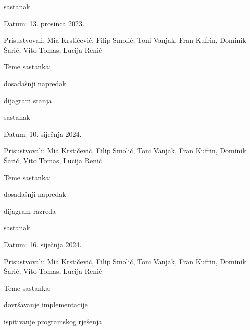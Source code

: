 \begin{packed_enum}
			\item  sastanak
			\item[] \begin{packed_item}
				\item Datum: 13. prosinca 2023.
				\item Prisustvovali: Mia Krstičević, Filip Smolić, Toni Vanjak, Fran Kufrin, Dominik Šarić, Vito Tomas, Lucija Renić
				\item Teme sastanka:
				\begin{packed_item}
					\item dosadašnji napredak
					\item dijagram stanja
				\end{packed_item}
			\end{packed_item}
			
			\item  sastanak
			\item[] \begin{packed_item}
				\item Datum: 10. siječnja 2024.
				\item Prisustvovali: Mia Krstičević, Filip Smolić, Toni Vanjak, Fran Kufrin, Dominik Šarić, Vito Tomas, Lucija Renić
				\item Teme sastanka:
				\begin{packed_item}
					\item dosadašnji napredak
					\item dijagram razreda
				\end{packed_item}
			\end{packed_item}
			
			\item  sastanak
			\item[] \begin{packed_item}
				\item Datum: 16. siječnja 2024.
				\item Prisustvovali: Mia Krstičević, Filip Smolić, Toni Vanjak, Fran Kufrin, Dominik Šarić, Vito Tomas, Lucija Renić
				\item Teme sastanka:
				\begin{packed_item}
					\item dovršavanje implementacije
					\item ispitivanje programskog rješenja
				\end{packed_item}
			\end{packed_item}
			
			
		\end{packed_enum}
		
